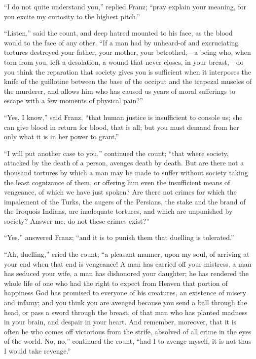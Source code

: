 “I do not quite understand you,” replied Franz; “pray explain your
meaning, for you excite my curiosity to the highest pitch.”

“Listen,” said the count, and deep hatred mounted to his face, as the
blood would to the face of any other. “If a man had by unheard-of and
excruciating tortures destroyed your father, your mother, your
betrothed,—a being who, when torn from you, left a desolation, a wound
that never closes, in your breast,—do you think the reparation that
society gives you is sufficient when it interposes the knife of the
guillotine between the base of the occiput and the trapezal muscles of
the murderer, and allows him who has caused us years of moral
sufferings to escape with a few moments of physical pain?”

“Yes, I know,” said Franz, “that human justice is insufficient to
console us; she can give blood in return for blood, that is all; but
you must demand from her only what it is in her power to grant.”

“I will put another case to you,” continued the count; “that where
society, attacked by the death of a person, avenges death by death. But
are there not a thousand tortures by which a man may be made to suffer
without society taking the least cognizance of them, or offering him
even the insufficient means of vengeance, of which we have just spoken?
Are there not crimes for which the impalement of the Turks, the augers
of the Persians, the stake and the brand of the Iroquois Indians, are
inadequate tortures, and which are unpunished by society? Answer me, do
not these crimes exist?”

“Yes,” answered Franz; “and it is to punish them that duelling is
tolerated.”

“Ah, duelling,” cried the count; “a pleasant manner, upon my soul, of
arriving at your end when that end is vengeance! A man has carried off
your mistress, a man has seduced your wife, a man has dishonored your
daughter; he has rendered the whole life of one who had the right to
expect from Heaven that portion of happiness God has promised to
everyone of his creatures, an existence of misery and infamy; and you
think you are avenged because you send a ball through the head, or pass
a sword through the breast, of that man who has planted madness in your
brain, and despair in your heart. And remember, moreover, that it is
often he who comes off victorious from the strife, absolved of all
crime in the eyes of the world. No, no,” continued the count, “had I to
avenge myself, it is not thus I would take revenge.”

